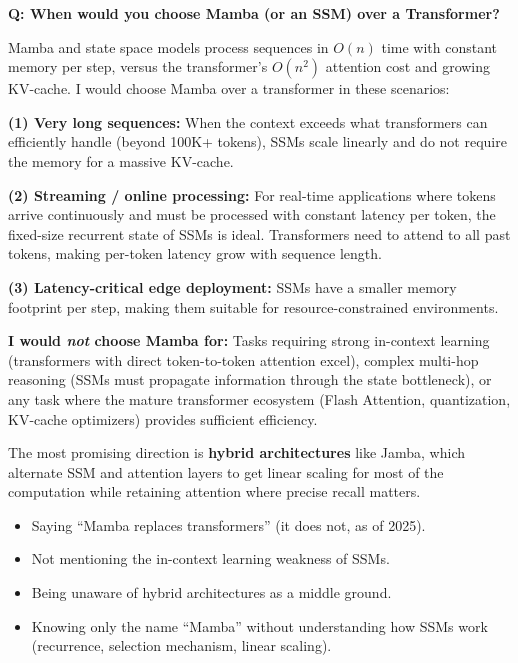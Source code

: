 \begin{interviewq}
\textbf{Q: When would you choose Mamba (or an SSM) over a Transformer?}

 \quad {} \quad
\badgefreq{\freqmed}

\stronganswer
Mamba and state space models process sequences in $O(n)$ time with constant
memory per step, versus the transformer's $O(n^2)$ attention cost and growing
KV-cache.  I would choose Mamba over a transformer in these scenarios:

\textbf{(1) Very long sequences:} When the context exceeds what transformers
can efficiently handle (beyond 100K+ tokens), SSMs scale linearly and do not
require the memory for a massive KV-cache.

\textbf{(2) Streaming / online processing:} For real-time applications where
tokens arrive continuously and must be processed with constant latency per
token, the fixed-size recurrent state of SSMs is ideal.  Transformers need to
attend to all past tokens, making per-token latency grow with sequence length.

\textbf{(3) Latency-critical edge deployment:} SSMs have a smaller memory
footprint per step, making them suitable for resource-constrained environments.

\textbf{I would \emph{not} choose Mamba for:} Tasks requiring strong
in-context learning (transformers with direct token-to-token attention excel),
complex multi-hop reasoning (SSMs must propagate information through the
state bottleneck), or any task where the mature transformer ecosystem
(Flash Attention, quantization, KV-cache optimizers) provides sufficient
efficiency.

The most promising direction is \textbf{hybrid architectures} like Jamba,
which alternate SSM and attention layers to get linear scaling for most of
the computation while retaining attention where precise recall matters.

\redflags
\begin{itemize}
\item Saying ``Mamba replaces transformers'' (it does not, as of 2025).
\item Not mentioning the in-context learning weakness of SSMs.
\item Being unaware of hybrid architectures as a middle ground.
\item Knowing only the name ``Mamba'' without understanding how SSMs work
  (recurrence, selection mechanism, linear scaling).
\end{itemize}


\end{interviewq}
